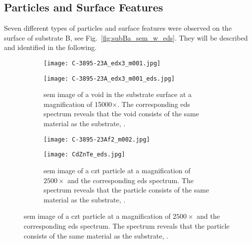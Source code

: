 \subsection{Particles and Surface Features}
Seven different types of particles and surface features were observed on the surface of substrate B, see Fig.~\ref{fig:subBa_sem_w_eds}. They will be described and identified in the following.

\begin{figure}[htbp]
    \centering
    \begin{subfigure}[t]{\textwidth}
          \begin{minipage}[t]{0.48\linewidth}
            \centering
            \texttt{[image: C-3895-23A\_edx3\_m001.jpg]}
          \end{minipage}
          \hspace{0.02\linewidth}
          \begin{minipage}[t]{0.48\linewidth}
            \centering
            \texttt{[image: C-3895-23A\_edx3\_m001\_eds.jpg]}
          \end{minipage}
        \caption{\ac{sem} image of a void in the substrate surface at a magnification of 15000$\times$. The corresponding \ac{eds} spectrum reveals that the void consists of the same material as the substrate, .}\label{fig:SEM_C389523_void_eds}
    \end{subfigure}%
    \par\bigskip
    \begin{subfigure}[t]{\textwidth}
          \begin{minipage}[t]{0.48\linewidth}
            \centering
            \texttt{[image: C-3895-23Af2\_m002.jpg]}
          \end{minipage}
          \hspace{0.02\linewidth}
          \begin{minipage}[t]{0.49\linewidth}
            \centering
            \texttt{[image: CdZnTe\_eds.jpg]}
          \end{minipage}
        \caption{\Ac{sem} image of a \ac{czt} particle at a magnification of $2500\times$ and the corresponding \ac{eds} spectrum. The spectrum reveals that the particle consists of the same material as the substrate, .}\label{fig:SEM_B_particulates_eds}

\end{subfigure}
\end{figure}
